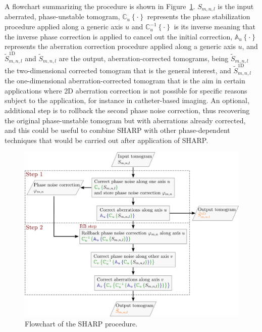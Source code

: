 A flowchart summarizing the procedure is shown in Figure~\ref{fig:SHARPFlowDiag}. $S_{m,n,l}$ is the input aberrated, phase-unstable tomogram, $\mathbb{C}_u\left\{\cdot\right\}$ represents the phase stabilization procedure applied along a generic axis $u$  and $\mathbb{C}_u^{-1}\left\{\cdot\right\}$ is its inverse meaning that the inverse phase correction is applied to cancel out the initial correction, $\mathbb{A}_u\left\{\cdot\right\}$ represents the aberration correction procedure applied along a generic axis $u$, and $\tilde{S}^{\text{1D}}_{m,n,l}$ and $\tilde{S}_{m,n,l}$ are the output, aberration-corrected tomograms, being $\tilde{S}_{m,n,l}$ the two-dimensional corrected tomogram that is the general interest, and $\tilde{S}^{\text{1D}}_{m,n,l}$ the one-dimensional aberration-corrected tomogram that is the aim in certain applications where 2D aberration correction is not possible for specific reasons subject to the application, for instance in catheter-based imaging. An optional, additional step is to rollback the second phase noise correction, thus recovering the original phase-unstable tomogram but with aberrations already corrected, and this could be useful to combine SHARP with other phase-dependent techniques that would be carried out after application of SHARP.

\begin{figure}[htb!]
	\centering
	\includegraphics[width=\textwidth]{Figures/SHARP/BlockDiagram.pdf}
	\caption[Flowchart of the SHARP procedure.]{Flowchart of the SHARP procedure.}
	\label{fig:SHARPFlowDiag}
\end{figure}
\FloatBarrier

